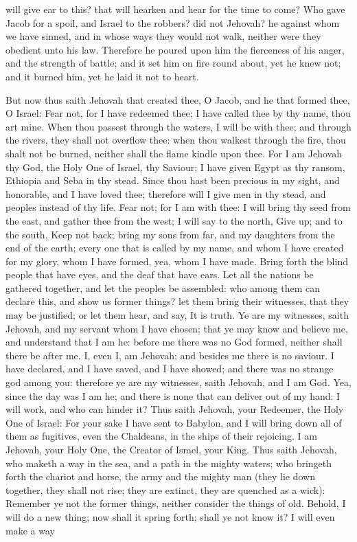 will give ear to this? that will hearken and hear for the time to come? Who gave Jacob for a spoil, and Israel to the robbers? did not Jehovah? he against whom we have sinned, and in whose ways they would not walk, neither were they obedient unto his law. Therefore he poured upon him the fierceness of his anger, and the strength of battle; and it set him on fire round about, yet he knew not; and it burned him, yet he laid it not to heart. 

But now thus saith Jehovah that created thee, O Jacob, and he that formed thee, O Israel: Fear not, for I have redeemed thee; I have called thee by thy name, thou art mine. When thou passest through the waters, I will be with thee; and through the rivers, they shall not overflow thee: when thou walkest through the fire, thou shalt not be burned, neither shall the flame kindle upon thee. For I am Jehovah thy God, the Holy One of Israel, thy Saviour; I have given Egypt as thy ransom, Ethiopia and Seba in thy stead. Since thou hast been precious in my sight, and honorable, and I have loved thee; therefore will I give men in thy stead, and peoples instead of thy life. Fear not; for I am with thee: I will bring thy seed from the east, and gather thee from the west; I will say to the north, Give up; and to the south, Keep not back; bring my sons from far, and my daughters from the end of the earth; every one that is called by my name, and whom I have created for my glory, whom I have formed, yea, whom I have made.  Bring forth the blind people that have eyes, and the deaf that have ears. Let all the nations be gathered together, and let the peoples be assembled: who among them can declare this, and show us former things? let them bring their witnesses, that they may be justified; or let them hear, and say, It is truth. Ye are my witnesses, saith Jehovah, and my servant whom I have chosen; that ye may know and believe me, and understand that I am he: before me there was no God formed, neither shall there be after me. I, even I, am Jehovah; and besides me there is no saviour. I have declared, and I have saved, and I have showed; and there was no strange god among you: therefore ye are my witnesses, saith Jehovah, and I am God. Yea, since the day was I am he; and there is none that can deliver out of my hand: I will work, and who can hinder it?  Thus saith Jehovah, your Redeemer, the Holy One of Israel: For your sake I have sent to Babylon, and I will bring down all of them as fugitives, even the Chaldeans, in the ships of their rejoicing. I am Jehovah, your Holy One, the Creator of Israel, your King. Thus saith Jehovah, who maketh a way in the sea, and a path in the mighty waters; who bringeth forth the chariot and horse, the army and the mighty man (they lie down together, they shall not rise; they are extinct, they are quenched as a wick): Remember ye not the former things, neither consider the things of old. Behold, I will do a new thing; now shall it spring forth; shall ye not know it? I will even make a way 